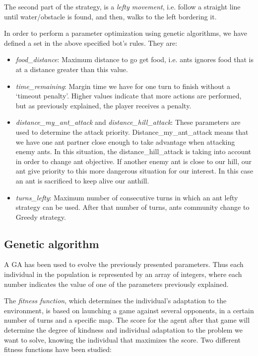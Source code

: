 \documentclass[runningheads]{llncs}
\begin{document}
The second part of the strategy, is a \textit{lefty movement}, i.e. follow a straight line until water/obstacle is found, and then, walks to the left bordering it.

 
In order to perform a parameter optimization using genetic algorithms, we have defined a set in the above specified bot's rules. They are:
\begin{itemize}
  \item {\em food\_distance}: Maximum distance to go get food, i.e. ants ignores food that is at a distance greater than this value.
  \item {\em time\_remaining}: Margin time we have for one turn to finish without a `timeout penalty'. Higher values indicate that more actions are performed, but as previously explained, the player receives a penalty.
  \item {\em distance\_my\_ant\_attack} and {\em distance\_hill\_attack}: These parameters are used to determine the attack priority.  Distance\_my\_ant\_attack means that we have one ant partner close enough to take advantage when attacking enemy ants. In this situation, the distance\_hill\_attack is taking into account in order to change ant objective. If another enemy ant is close to our hill, our ant give priority to this more dangerous situation for our interest. In this case an ant is sacrificed to keep alive our anthill.
  \item {\em turns\_lefty}: Maximum number of consecutive turns in which an ant lefty strategy can be used. After that number of turns, ants community change to Greedy strategy.

\end{itemize}

\subsection{Genetic algorithm}
A GA has been used to evolve the previously presented parameters. 
Thus each individual in the population is represented by an array of integers, where each number indicates the value of one of the parameters previously explained.

The \textit{fitness function}, which determines the individual's adaptation to the environment, is based on launching a game against several opponents, in a certain number of turns and a specific map.
The score for the agent after that game will determine the degree of kindness and individual adaptation to the problem we want to solve, knowing the individual that maximizes the score. Two different fitness functions have been studied:
\end{document}
